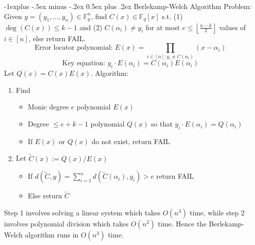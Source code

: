 \documentclass[frenchspacing,9pt,landscape,a4paper]{article}
\makeatletter
\renewcommand{\subsection}{\@startsection{subsection}{2}{0mm}%
                                {-1explus -.5ex minus -.2ex}%
                                {0.5ex plus .2ex}%
                                {\normalfont\normalsize\bfseries}}
\newcommand{\BF}{\mathbb F}
\newcommand{\floor}[1]{\left\lfloor #1 \right\rfloor}
\theoremstyle{remark}
\makeatother
\begin{document}
\begin{multicols}{4}
\subsection{Berlekamp-Welch Algorithm}
Problem: Given $y=(y_1,\dots,y_n)\in\BF_q^n$, find $C(x)\in\BF_q[x]$ s.t. (1)  $\deg(C(x))\leq k-1$ and (2)
$C(\alpha_i)\neq y_i$ for at most  $e\leq\floor{\frac{n-k}{2}}$ values of $i\in[n]$, else return FAIL.
\[\text{Error locator polynomial: }E(x)=\prod_{i\in[n]:y_i\neq C(\alpha_i)}(x-\alpha_i)\]
\[\text{Key equation: }y_i\cdot E(\alpha_i)=C(\alpha_i)E(\alpha_i)\]
Let $Q(x)=C(x)E(x)$. Algorithm:
\begin{enumerate}
    \item Find
        \begin{itemize}
            \item Monic degree $e$ polynomial  $E(x)$
            \item Degree  $\leq e+k-1$ polynomial  $Q(x)$ so that $y_i\cdot E(\alpha_i)=Q(\alpha_i)$
            \item If $E(x)$ or  $Q(x)$ do not exist, return FAIL 
        \end{itemize}
    \item Let $\tilde{C}(x):=Q(x) /E(x)$
         \begin{itemize}
             \item If $d(\tilde{C},y)=\sum_{i=1}^n d(\tilde{C}(\alpha_i),y_i)>e$ return FAIL
             \item Else return  $\tilde{C}$
        \end{itemize}
\end{enumerate}
Step 1 involves solving a linear system which takes $O(n^3)$ time, while step 2 involves polynomial
division which takes $O(n^2)$ time. Hence the Berlekamp-Welch algorithm runs in  $O(n^3)$ time.
\end{multicols}
\end{document}
